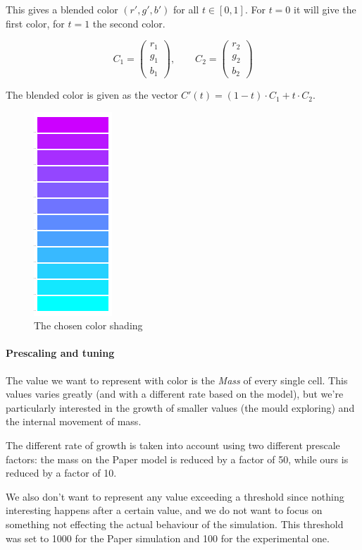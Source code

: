 This gives a blended color $(r',g',b')$ for all $t\in[0,1]$. For $t=0$ it will give the first color, for $t=1$ the second color.


$$ C_1=\begin{pmatrix}r_1\\g_1\\b_1\end{pmatrix}, \qquad C_2=\begin{pmatrix}r_2\\g_2\\b_2\end{pmatrix}$$

The blended color is given as the vector $C'(t)=(1-t)\cdot C_1+t\cdot C_2$.


\begin{figure}
  \centering
    \includegraphics{colorshade1}%
    
  \caption{The chosen color shading}
  \label{fig:color}
\end{figure}


\paragraph{Prescaling and tuning}

The value we want to represent with color is the \textit{Mass} of every single cell. This values varies greatly (and with a different rate based on the model), but we're particularly interested in the growth of smaller values (the mould exploring) and the internal movement of mass.

The different rate of growth is taken into account using two different prescale factors: the mass on the Paper model is reduced by a factor of 50, while ours is reduced by a factor of 10.

We also don't want to represent any value exceeding a threshold since nothing interesting happens after a certain value, and we do not want to focus on something not effecting the actual behaviour of the simulation. This threshold was set to 1000 for the Paper simulation and 100 for the experimental one.

